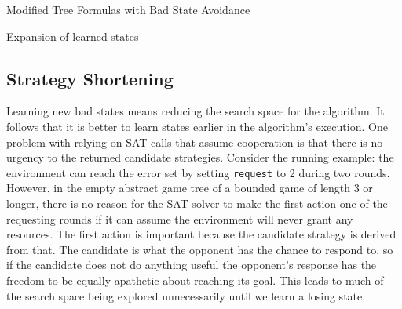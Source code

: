 \begin{algorithm}
    \caption{Modified Tree Formulas with Bad State Avoidance}
    \label{alg:treeFormulaLearning}
    \begin{algorithmic}[1]
        \State {}
        \Else
        \State {}
        \EndIf
        \EndFunction
    \end{algorithmic}

    \begin{algorithmic}[1]
        \State {}
        \Else
        \State {}
        \EndIf
        \EndFunction
    \end{algorithmic}
\end{algorithm}

\begin{algorithm}
    \caption{Expansion of learned states}
    \label{alg:boundedLearning}
    \begin{algorithmic}
        \EndFunction
    \end{algorithmic}
\end{algorithm}

\subsection{Strategy Shortening}

Learning new bad states means reducing the search space for the algorithm. It follows that it is better to learn states earlier in the algorithm's execution. One problem with relying on SAT calls that assume cooperation is that there is no urgency to the returned candidate strategies. Consider the running example: the environment can reach the error set by setting \texttt{request} to 2 during two rounds. However, in the empty abstract game tree of a bounded game of length 3 or longer, there is no reason for the SAT solver to make the first action one of the requesting rounds if it can assume the environment will never grant any resources. The first action is important because the candidate strategy is derived from that. The candidate is what the opponent has the chance to respond to, so if the candidate does not do anything useful the opponent's response has the freedom to be equally apathetic about reaching its goal. This leads to much of the search space being explored unnecessarily until we learn a losing state.


